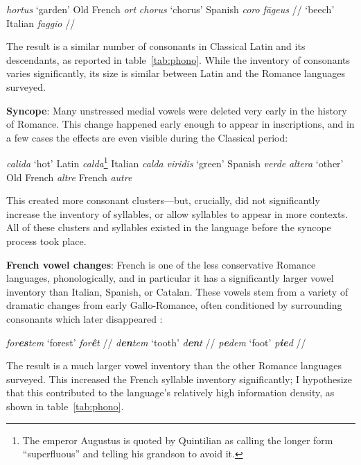 \documentclass[12pt,twoside]{article}
\newcommand{\ipa}[1]{/\textipa{#1}/}
\newcommand{\yields}{\textrightarrow}
\begin{document}
\begin{exe}
\ex \emph{hortus} `garden' \yields{} Old French \emph{ort}
\ex \emph{chorus} `chorus' \yields{} Spanish \emph{coro}
\ex \emph{f\=ageus} \ipa{fa:geus} `beech' \yields{} Italian \emph{faggio} \ipa{faddZo}
\end{exe}

The result is a similar number of consonants in Classical Latin and its descendants, as reported in table~\ref{tab:phono}. While the inventory of consonants varies significantly, its size is similar between Latin and the Romance languages surveyed.

\textbf{Syncope}: Many unstressed medial vowels were deleted very early in the history of Romance. This change happened early enough to appear in inscriptions, and in a few cases the effects are even visible during the Classical period:

\begin{exe}
\ex \emph{calida} `hot' \yields{} Latin \emph{calda}\footnote{The emperor Augustus is quoted by Quintilian \citep[I.6.19]{quintilian} as calling the longer form ``superfluous'' and telling his grandson to avoid it.} \yields{} Italian \emph{calda}
\ex \emph{viridis} `green' \yields{} Spanish \emph{verde}
\ex \emph{altera} `other' \yields{} Old French \emph{altre} \yields{} French \emph{autre}
\end{exe}

This created more consonant clusters---but, crucially, did not significantly increase the inventory of syllables, or allow syllables to appear in more contexts. All of these clusters and syllables existed in the language before the syncope process took place.

\textbf{French vowel changes}: French is one of the less conservative Romance languages, phonologically, and in particular it has a significantly larger vowel inventory than Italian, Spanish, or Catalan. These vowels stem from a variety of dramatic changes from early Gallo-Romance, often conditioned by surrounding consonants which later disappeared \citep{pope,boyd}:

\begin{exe}
\ex \emph{for\textbf{es}tem} `forest' \yields{} \emph{for\textbf{\^e}t} \ipa{fOKE}
\ex \emph{d\textbf{en}tem} `tooth' \yields{} \emph{d\textbf{en}t} \ipa{d\~A}
\ex \emph{p\textbf{e}dem} `foot' \yields{} \emph{p\textbf{ie}d} \ipa{pje}
\end{exe}

The result is a much larger vowel inventory than the other Romance languages surveyed. This increased the French syllable inventory significantly; I hypothesize that this contributed to the language's relatively high information density, as shown in table~\ref{tab:phono}.
\end{document}

